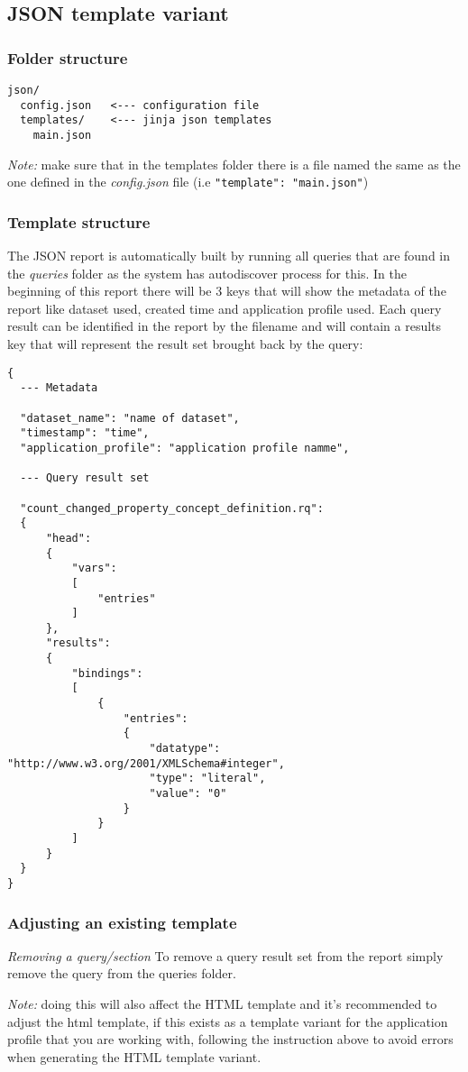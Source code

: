 \subsection{JSON template variant}
\subsubsection{Folder structure}

\begin{lstlisting}
json/
  config.json   <--- configuration file
  templates/    <--- jinja json templates
    main.json
\end{lstlisting}

\textit{Note:} make sure that in the templates folder there is a file named the same as the one defined in the \textit{config.json} file (i.e \texttt{"template": "main.json"})

\subsubsection{Template structure}
The JSON report is automatically built by running all queries that are found in the \textit{queries} folder as the system has autodiscover process for this. In the beginning of this report there will be 3 keys that will show the metadata of the report like dataset used, created time and application profile used. Each query result can be identified in the report by the filename and will contain a results key that will represent the result set brought back by the query:

\begin{lstlisting}
{
  --- Metadata
  
  "dataset_name": "name of dataset",
  "timestamp": "time",
  "application_profile": "application profile namme",
  
  --- Query result set
  
  "count_changed_property_concept_definition.rq":
  {
      "head":
      {
          "vars":
          [
              "entries"
          ]
      },
      "results":
      {
          "bindings":
          [
              {
                  "entries":
                  {
                      "datatype": "http://www.w3.org/2001/XMLSchema#integer",
                      "type": "literal",
                      "value": "0"
                  }
              }
          ]
      }
  }
}
\end{lstlisting}

\subsubsection{Adjusting an existing template}
\textit{Removing a query/section}
To remove a query result set from the report simply remove the query from the queries folder.

\textit{Note:} doing this will also affect the HTML template and it's recommended to adjust the html template, if this exists as a template variant for the application profile that you are working with, following the instruction above to avoid errors when generating the HTML template variant.